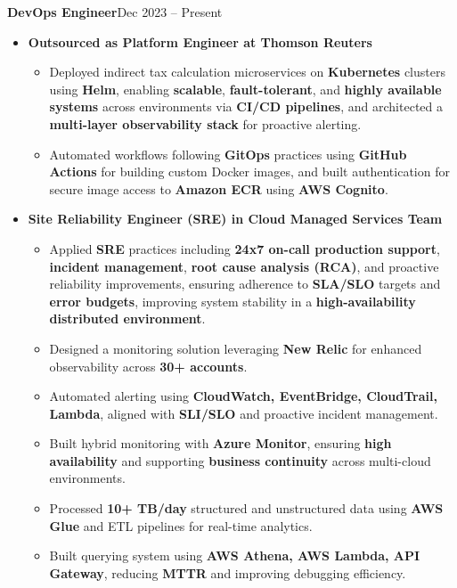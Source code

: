 \documentclass[a4paper,10.999999pt]{article}
\newenvironment{joblong}[2]
        {
        \noindent\textbf{#1}\hfill{#2}\par
        \vspace{0.3pt}
        \begin{minipage}[t]{\linewidth}
        \begin{itemize}[after=\strut, topsep=0.3pt, partopsep=0pt, parsep=0pt, leftmargin=0.5em, itemsep=0.35pt, label=\raisebox{0.2ex}{\tiny$\circ$}]
        }
        {
        \end{itemize}
        \end{minipage}
        \vspace{0.5pt}
        }
\begin{document}
    \begin{joblong}{DevOps Engineer}{Dec 2023 -- Present}
    Intuitive.Cloud
    \item \textbf{Outsourced as Platform Engineer at Thomson Reuters}
    \begin{itemize}
    \item Deployed indirect tax calculation microservices on \textbf{Kubernetes} clusters using \textbf{Helm}, enabling \textbf{scalable}, \textbf{fault-tolerant}, and \textbf{highly available systems} across environments via \textbf{CI/CD pipelines}, and architected a \textbf{multi-layer observability stack} for proactive alerting.
    \item Automated workflows following \textbf{GitOps} practices using \textbf{GitHub Actions} for building custom Docker images, and built authentication for secure image access to \textbf{Amazon ECR} using \textbf{AWS Cognito}.
    \end{itemize}
    \vspace{0.5pt}

    \item \textbf{Site Reliability Engineer (SRE) in Cloud Managed Services Team}
    \begin{itemize}

    \item Applied \textbf{SRE} practices including \textbf{24x7 on-call production support}, \textbf{incident management}, \textbf{root cause analysis (RCA)}, and proactive reliability improvements, ensuring adherence to \textbf{SLA/SLO} targets and \textbf{error budgets}, improving system stability in a \textbf{high-availability distributed environment}.
    \item Designed a monitoring solution leveraging \textbf{New Relic} for enhanced observability across \textbf{30+ accounts}.
    \item Automated alerting using \textbf{CloudWatch, EventBridge, CloudTrail, Lambda}, aligned with \textbf{SLI/SLO} and proactive incident management.

    \item Built hybrid monitoring with \textbf{Azure Monitor}, ensuring \textbf{high availability} and supporting \textbf{business continuity} across multi-cloud environments.
    \item Processed \textbf{10+ TB/day} structured and unstructured data using \textbf{AWS Glue} and ETL pipelines for real-time analytics.
    \item Built querying system using \textbf{AWS Athena, AWS Lambda, API Gateway}, reducing \textbf{MTTR} and improving debugging efficiency.
    
    
    \end{itemize}
    
    \end{joblong}
    
\end{document}
